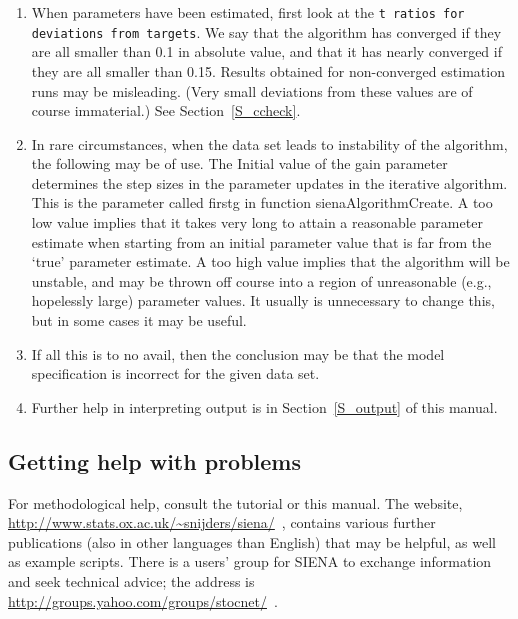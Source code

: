 \documentclass[a4paper,fleqn,11pt]{article}
\newcommand{\+}{\, + \,}
\newcommand{\SI}{{\sf SIENA }}
\begin{document}
\begin{enumerate}
      If Jaccard indices are low because the network is mainly increasing
      (creation of new ties) or decreasing (termination of ties),
      this is no problem for the \SI method.
\item When parameters have been estimated, first look at the \texttt{t
      ratios for deviations from targets}.
      We say that the algorithm has converged if they are all smaller than 0.1
      in absolute value, and that it has nearly converged if they are all
      smaller than 0.15. Results obtained for non-converged estimation
      runs may be misleading. (Very small deviations from these
      values are of course immaterial.) See Section~\ref{S_ccheck}.
\item In rare circumstances, when the data set leads to instability
      of the algorithm, the following may be of use.
      The \textsf{Initial value of the gain parameter} determines the
      step sizes in the parameter updates in the iterative
      algorithm.
      This is the parameter called \textsf{firstg}
      in function \textsf{sienaAlgorithmCreate}.
      A too low value implies that it takes very long to attain a
      reasonable parameter estimate when starting from an initial
      parameter value that is far from the `true' parameter estimate.
      A too high value implies that the algorithm will be unstable,
      and may be thrown off course into a region of unreasonable
      (e.g., hopelessly large) parameter values. It usually is unnecessary
      to change this, but in some cases it may be useful.
\item If all this is to no avail, then the conclusion may be that the model
      specification is incorrect for the given data set.
\item Further help in interpreting output is in Section~\ref{S_output} of
      this manual.
\end{enumerate}


\subsection{Getting help with problems}
\label{sec:problems}

For methodological help, consult the tutorial  \citet{SnijdersEA10b} or this manual.
The website, {\small\url{http://www.stats.ox.ac.uk/~snijders/siena/}~}, contains
various further publications (also in other languages than English) that may
be helpful, as well as example scripts.
There is a users' group for \SI to exchange information and seek technical
advice; the address is {\small\url{http://groups.yahoo.com/groups/stocnet/}~}.
\end{document}
